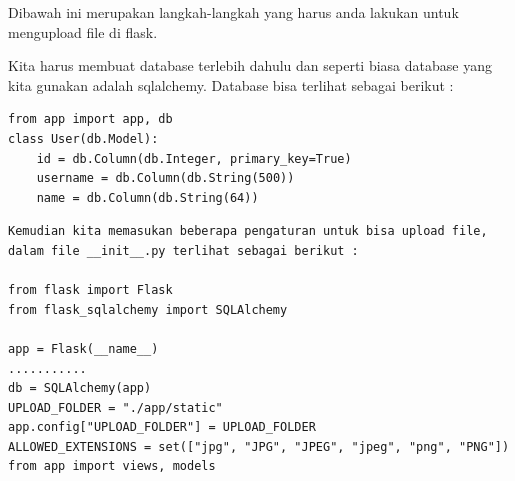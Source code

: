 Dibawah ini merupakan langkah-langkah yang harus anda lakukan untuk mengupload file di flask.

Kita harus membuat database terlebih dahulu dan seperti biasa database yang kita gunakan adalah sqlalchemy. Database bisa terlihat sebagai berikut :

\begin{verbatim}
from app import app, db
class User(db.Model):
    id = db.Column(db.Integer, primary_key=True)
    username = db.Column(db.String(500))
    name = db.Column(db.String(64))
\end{verbatim}

\begin{verbatim}
Kemudian kita memasukan beberapa pengaturan untuk bisa upload file, 
dalam file __init__.py terlihat sebagai berikut :

from flask import Flask
from flask_sqlalchemy import SQLAlchemy

app = Flask(__name__)
...........
db = SQLAlchemy(app)
UPLOAD_FOLDER = "./app/static"
app.config["UPLOAD_FOLDER"] = UPLOAD_FOLDER
ALLOWED_EXTENSIONS = set(["jpg", "JPG", "JPEG", "jpeg", "png", "PNG"])
from app import views, models
\end{verbatim}

